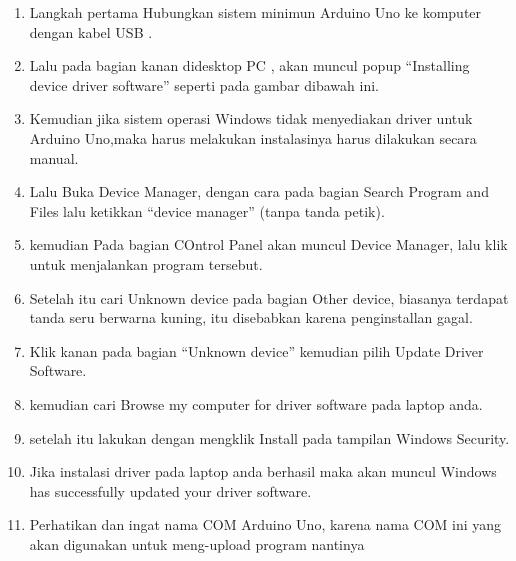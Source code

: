 \begin{enumerate}
	\item Langkah pertama Hubungkan sistem minimun Arduino Uno ke komputer dengan kabel USB .
	\item Lalu pada bagian kanan didesktop PC , akan muncul popup “Installing device driver software” seperti pada gambar dibawah ini.
	\item Kemudian jika sistem  operasi Windows tidak menyediakan driver untuk Arduino Uno,maka harus  melakukan instalasinya harus dilakukan secara manual.
	\item Lalu  Buka Device Manager,  dengan cara pada bagian Search Program and Files lalu ketikkan “device manager” (tanpa tanda petik). 
	\item kemudian Pada bagian COntrol Panel akan muncul Device Manager, lalu klik untuk menjalankan program tersebut.
	\item Setelah itu cari  Unknown device pada bagian Other device, biasanya terdapat tanda seru berwarna kuning, itu disebabkan karena penginstallan gagal.
	\item Klik kanan pada bagian  “Unknown device” kemudian pilih Update Driver Software.
	\item kemudian cari Browse my computer for driver software pada laptop anda.
	\item setelah itu lakukan dengan mengklik Install pada tampilan Windows Security.
	\item Jika instalasi driver pada laptop anda berhasil maka akan muncul Windows has successfully updated your driver software.
	\item Perhatikan dan ingat nama COM Arduino Uno, karena nama COM ini yang akan digunakan untuk meng-upload program nantinya
\end{enumerate}

